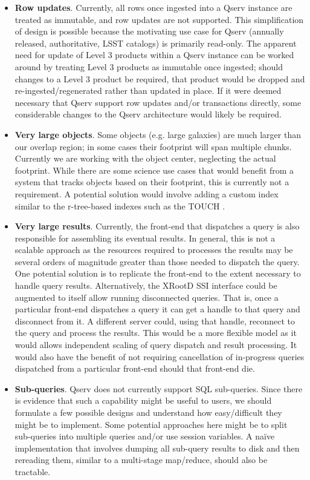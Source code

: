 \documentclass[DM,toc]{lsstdoc}
\begin{document}
\begin{itemize}
\item
  \textbf{Row updates}. Currently, all rows once ingested into a Qserv
  instance are treated as immutable, and row updates are not supported. This
  simplification of design is possible because the motivating use case for
  Qserv (annually released, authoritative, LSST catalogs) is primarily
  read-only.  The apparent need for update of Level 3 products within a Qserv
  instance can be worked around by treating Level 3 products as immutable once
  ingested; should changes to a Level 3 product be required, that product
  would be dropped and re-ingested/regenerated rather than updated in place.
  If it were deemed necessary that Qserv support row updates and/or
  transactions directly, some considerable changes to the Qserv architecture
  would likely be required.
\item
  \textbf{Very large objects}. Some objects (e.g. large galaxies) are
  much larger than our overlap region; in some cases their footprint
  will span multiple chunks. Currently we are working with the object
  center, neglecting the actual footprint. While there are some science
  use cases that would benefit from a system that tracks objects based
  on their footprint, this is currently not a requirement. A potential
  solution would involve adding a custom index similar to the
  r-tree-based indexes such as the TOUCH
  \citep{Nobari:2013:TIS:2463676.2463700}.
\item
  \textbf{Very large results}. Currently, the front-end that dispatches
  a query is also responsible for assembling its eventual results. In general,
  this is not a scalable approach as the resources required to processes the
  results may be several orders of magnitude greater than those needed
  to dispatch the query.  One potential solution is to replicate the
  front-end to the extent necessary to handle query results. Alternatively,
  the XRootD SSI interface could be augmented to itself allow running
  disconnected queries. That is, once a particular front-end dispatches
  a query it can get a handle to that query and disconnect from it.
  A different server could, using that handle, reconnect to the query and
  process the results. This would be a more flexible model as it would allows
  independent scaling of query dispatch and result processing. It would also
  have the benefit of not requiring cancellation of in-progress queries
  dispatched from a particular front-end should that front-end die.
\item
  \textbf{Sub-queries}. Qserv does not currently support SQL sub-queries.
  Since there is evidence that such a capability might be useful to users, we
  should formulate a few possible designs and understand how easy/difficult
  they might be to implement.  Some potential approaches here might be to
  split sub-queries into multiple queries and/or use session variables. A
  naïve implementation that involves dumping all sub-query results to disk
  and then rereading them, similar to a multi-stage map/reduce, should also
  be tractable.
\end{itemize}
\end{document}
